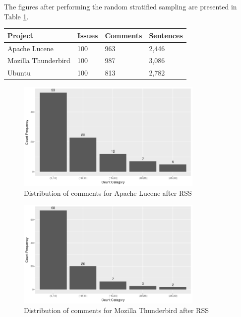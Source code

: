 \documentclass[a4paper,12pt,twoside]{report}
\begin{document}
The figures after performing the random stratified sampling are presented in Table \ref{tab:overviewRSS}. 

\begin{table} %
    \centering
    \begin{adjustbox}{max width=\columnwidth}
    \def\arraystretch{1} %
    \begin{tabular}{p{4cm} p{1cm} p{2cm} p{3cm}}
        \toprule
        \textbf{Project} & \textbf{Issues} & \textbf{Comments} & \textbf{Sentences}\\
        \midrule
			Apache Lucene & 100 & 963 & 2,446\\
			Mozilla Thunderbird & 100 & 987 & 3,086\\ 
			Ubuntu & 100 & 813 & 2,782\\
        \midrule
    \end{tabular}
    \end{adjustbox}
    \label{tab:overviewRSS}
\end{table}

\begin{figure}[h] %
    \centering
    \includegraphics[width=9cm]{lucene-comment-distribution-rss}
    \caption{Distribution of comments for Apache Lucene after RSS}
    \label{fig:luceneRSSDistro}
\end{figure}

\begin{figure}[h] %
    \centering
    \includegraphics[width=9cm]{thunderbird-comment-distribution-rss}
    \caption{Distribution of comments for Mozilla Thunderbird after RSS}
    \label{fig:thunderbirdRSSDistro}
\end{figure}
\end{document}
